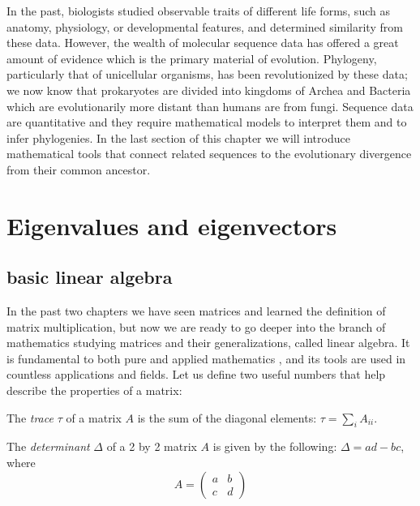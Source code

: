 \documentclass[
  letterpaper,
  DIV=11,
  numbers=noendperiod]{scrreprt}
\begin{document}
In the past, biologists studied observable traits of different life
forms, such as anatomy, physiology, or developmental features, and
determined similarity from these data. However, the wealth of molecular
sequence data has offered a great amount of evidence which is the
primary material of evolution. Phylogeny, particularly that of
unicellular organisms, has been revolutionized by these data; we now
know that prokaryotes are divided into kingdoms of Archea and Bacteria
which are evolutionarily more distant than humans are from fungi.
Sequence data are quantitative and they require mathematical models to
interpret them and to infer phylogenies. In the last section of this
chapter we will introduce mathematical tools that connect related
sequences to the evolutionary divergence from their common ancestor.

\hypertarget{eigenvalues-and-eigenvectors}{%
\section{Eigenvalues and
eigenvectors}\label{eigenvalues-and-eigenvectors}}

\hypertarget{basic-linear-algebra}{%
\subsection{basic linear algebra}\label{basic-linear-algebra}}

In the past two chapters we have seen matrices and learned the
definition of matrix multiplication, but now we are ready to go deeper
into the branch of mathematics studying matrices and their
generalizations, called linear algebra. It is fundamental to both pure
and applied mathematics \cite{strang_linear_2005}, and its tools are
used in countless applications and fields. Let us define two useful
numbers that help describe the properties of a matrix:

\begin{tcolorbox}[enhanced jigsaw, coltitle=black, arc=.35mm, opacitybacktitle=0.6, breakable, bottomtitle=1mm, toptitle=1mm, titlerule=0mm, colback=white, leftrule=.75mm, rightrule=.15mm, colframe=quarto-callout-note-color-frame, colbacktitle=quarto-callout-note-color!10!white, opacityback=0, title=\textcolor{quarto-callout-note-color}{\faInfo}\hspace{0.5em}{Definition}, left=2mm, toprule=.15mm, bottomrule=.15mm]

The \emph{trace} \(\tau\) of a matrix \(A\) is the sum of the diagonal
elements: \(\tau = \sum_i A_{ii}\).

The \emph{determinant} \(\Delta\) of a 2 by 2 matrix \(A\) is given by
the following: \(\Delta = ad - bc\), where
\[ A = \left(\begin{array}{cc}a & b \\c & d\end{array}\right) \]

\end{tcolorbox}
\end{document}
